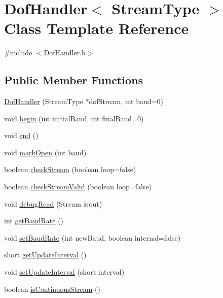 \hypertarget{class_dof_handler}{\section{Dof\-Handler$<$ Stream\-Type $>$ Class Template Reference}
\label{class_dof_handler}
}


{\ttfamily \#include $<$Dof\-Handler.\-h$>$}

\subsection*{Public Member Functions}
\begin{DoxyCompactItemize}
\item 
\hyperlink{class_dof_handler_a6c1f0b1c51bcdd5a1017f85681df705f}{Dof\-Handler} (Stream\-Type $\ast$dof\-Stream, int baud=0)
\item 
void \hyperlink{class_dof_handler_a19eb578adb6ec8abf970084b37275c35}{begin} (int initial\-Baud, int final\-Baud=0)
\item 
void \hyperlink{class_dof_handler_a4a7fbd2fafa018e3d96b6da9970ba06c}{end} ()
\item 
void \hyperlink{class_dof_handler_a7bd434cba7a8d31002c9e5047f52b169}{mark\-Open} (int baud)
\item 
boolean \hyperlink{class_dof_handler_a2d5969968005210d1ac30e3e15fdd95b}{check\-Stream} (boolean loop=false)
\item 
boolean \hyperlink{class_dof_handler_ab044eb90f34e9e91c1b275b63f319aaa}{check\-Stream\-Valid} (boolean loop=false)
\item 
void \hyperlink{class_dof_handler_afd5a1b22e8b718d484be5e60723b3f7f}{debug\-Read} (Stream \&out)
\item 
int \hyperlink{class_dof_handler_adc2ab970304df9f444f211f19ee88372}{get\-Baud\-Rate} ()
\item 
void \hyperlink{class_dof_handler_aa73eec60816919d8e269aa5d7a0d7fc2}{set\-Baud\-Rate} (int new\-Baud, boolean internal=false)
\item 
short \hyperlink{class_dof_handler_af3eaf45c8f0bafcbc4e42c29b2642d84}{get\-Update\-Interval} ()
\item 
void \hyperlink{class_dof_handler_ab658ac541f5ddd70dc1d0b04dbadf782}{set\-Update\-Interval} (short interval)
\item 
boolean \hyperlink{class_dof_handler_ac88b2e0ee4207b3a3d6460c2a4e5683b}{is\-Continuous\-Stream} ()
\item 

\end{DoxyCompactItemize}
